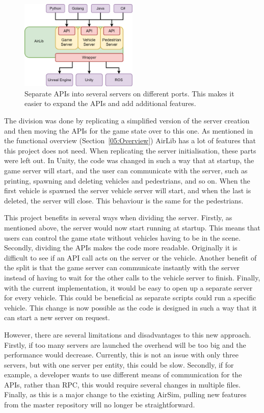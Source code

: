 \begin{figure}[h]
    \centering
    \includegraphics[width=0.5\textwidth]{05_AnalysisAndDesign/Diagrams/UpdatedOverview.png}
    \caption{Separate APIs into several servers on different ports. This makes it easier to expand the APIs and add additional features.}\label{05:SplitServer}
\end{figure}

The division was done by replicating a simplified version of the server creation and then moving the APIs for the game state over to this one. As mentioned in the functional overview (Section~\ref{05:Overview}) AirLib has a lot of features that this project does not need. When replicating the server initialisation, these parts were left out. In Unity, the code was changed in such a way that at startup, the game server will start, and the user can communicate with the server, such as printing, spawning and deleting vehicles and pedestrians, and so on. When the first vehicle is spawned the server vehicle server will start, and when the last is deleted, the server will close. This behaviour is the same for the pedestrians. 

This project benefits in several ways when dividing the server. Firstly, as mentioned above, the server would now start running at startup. This means that users can control the game state without vehicles having to be in the scene. Secondly, dividing the APIs makes the code more readable. Originally it is difficult to see if an API call acts on the server or the vehicle. Another benefit of the split is that the game server can communicate instantly with the server instead of having to wait for the other calls to the vehicle server to finish. Finally, with the current implementation, it would be easy to open up a separate server for every vehicle. This could be beneficial as separate scripts could run a specific vehicle. This change is now possible as the code is designed in such a way that it can start a new server on request. 

However, there are several limitations and disadvantages to this new approach. Firstly, if too many servers are launched the overhead will be too big and the performance would decrease. Currently, this is not an issue with only three servers, but with one server per entity, this could be slow. Secondly, if for example, a developer wants to use different means of communication for the APIs, rather than RPC, this would require several changes in multiple files. Finally, as this is a major change to the existing AirSim, pulling new features from the master repository will no longer be straightforward. 


